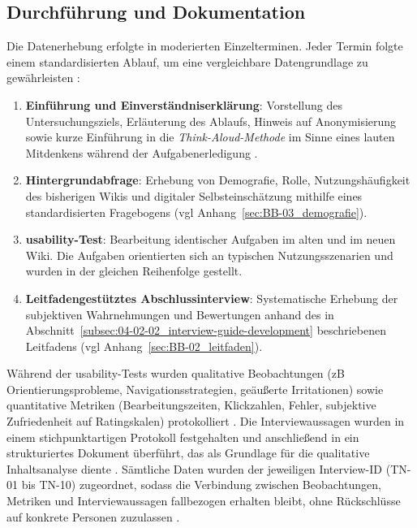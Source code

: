 \subsection{Durchführung und Dokumentation}
\label{subsec:04-02-03_execution-and-documentation}

Die Datenerhebung erfolgte in moderierten Einzelterminen. Jeder Termin folgte einem standardisierten Ablauf, um eine vergleichbare Datengrundlage zu gewährleisten \cite{405:KvaleBrinkmann2015,422:Flick2018}:
\begin{enumerate}
  \item \textbf{Einführung und Einverständniserklärung}: Vorstellung des Untersuchungsziels, Erläuterung des Ablaufs, Hinweis auf Anonymisierung sowie kurze Einführung in die \textit{Think-Aloud-Methode} im Sinne eines lauten Mitdenkens während der Aufgabenerledigung \cite{121:NNGUsabilityTesting,203:ConcurrentThinkAloud}. 
  \item \textbf{Hintergrundabfrage}: Erhebung von Demografie, Rolle, Nutzungshäufigkeit des bisherigen Wikis und digitaler Selbsteinschätzung mithilfe eines standardisierten Fragebogens (\acrshort{vgl} Anhang~\ref{sec:BB-03_demografie}).
  \item \textbf{\Gls{usability}-Test}: Bearbeitung identischer Aufgaben im alten und im neuen Wiki. Die Aufgaben orientierten sich an typischen Nutzungsszenarien und wurden in der gleichen Reihenfolge gestellt.
  \item \textbf{Leitfadengestütztes Abschlussinterview}: Systematische Erhebung der subjektiven Wahrnehmungen und Bewertungen anhand des in Abschnitt~\ref{subsec:04-02-02_interview-guide-development} beschriebenen Leitfadens (\acrshort{vgl} Anhang~\ref{sec:BB-02_leitfaden}).
\end{enumerate}

Während der \Gls{usability}-Tests wurden qualitative Beobachtungen (\acrshort{zB} Orientierungsprobleme, Navigationsstrategien, geäußerte Irritationen) sowie quantitative Metriken (Bearbeitungszeiten, Klickzahlen, Fehler, subjektive Zufriedenheit auf Ratingskalen) protokolliert \cite{121:NNGUsabilityTesting}. Die Interviewaussagen wurden in einem stichpunktartigen Protokoll festgehalten und anschließend in ein strukturiertes Dokument überführt, das als Grundlage für die qualitative Inhaltsanalyse diente \cite{421:Mayring2022,120:Mayring2014}. Sämtliche Daten wurden der jeweiligen Interview-ID (TN-01 bis TN-10) zugeordnet, sodass die Verbindung zwischen Beobachtungen, Metriken und Interviewaussagen fallbezogen erhalten bleibt, ohne Rückschlüsse auf konkrete Personen zuzulassen \cite{422:Flick2018}.
